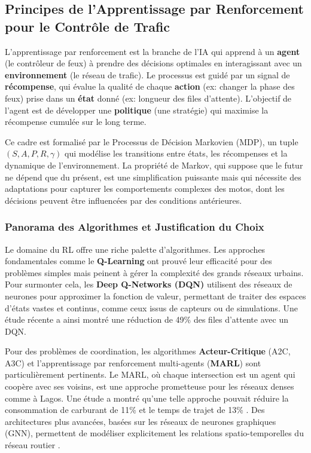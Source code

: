 \subsection{Principes de l'Apprentissage par Renforcement pour le Contrôle de Trafic}
\label{subsec:rl_principes_unifie}

L'apprentissage par renforcement est la branche de l'IA qui apprend à un \textbf{agent} (le contrôleur de feux) à prendre des décisions optimales en interagissant avec un \textbf{environnement} (le réseau de trafic). Le processus est guidé par un signal de \textbf{récompense}, qui évalue la qualité de chaque \textbf{action} (ex: changer la phase des feux) prise dans un \textbf{état} donné (ex: longueur des files d'attente). L'objectif de l'agent est de développer une \textbf{politique} (une stratégie) qui maximise la récompense cumulée sur le long terme.

Ce cadre est formalisé par le Processus de Décision Markovien (MDP), un tuple $(S, A, P, R, \gamma)$ qui modélise les transitions entre états, les récompenses et la dynamique de l'environnement. La propriété de Markov, qui suppose que le futur ne dépend que du présent, est une simplification puissante mais qui nécessite des adaptations pour capturer les comportements complexes des motos, dont les décisions peuvent être influencées par des conditions antérieures.

\subsubsection{Panorama des Algorithmes et Justification du Choix}
\label{subsubsec:rl_algos_unifie}

Le domaine du RL offre une riche palette d'algorithmes. Les approches fondamentales comme le \textbf{Q-Learning} ont prouvé leur efficacité pour des problèmes simples mais peinent à gérer la complexité des grands réseaux urbains. Pour surmonter cela, les \textbf{Deep Q-Networks (DQN)} utilisent des réseaux de neurones pour approximer la fonction de valeur, permettant de traiter des espaces d'états vastes et continus, comme ceux issus de capteurs ou de simulations. Une étude récente \cite{reinforcement2024approach} a ainsi montré une réduction de 49\% des files d'attente avec un DQN.

Pour des problèmes de coordination, les algorithmes \textbf{Acteur-Critique} (A2C, A3C) et l'apprentissage par renforcement multi-agents (\textbf{MARL}) sont particulièrement pertinents. Le MARL, où chaque intersection est un agent qui coopère avec ses voisins, est une approche prometteuse pour les réseaux denses comme à Lagos. Une étude a montré qu'une telle approche pouvait réduire la consommation de carburant de 11\% et le temps de trajet de 13\% \cite{multiagent2023reinforcement}. Des architectures plus avancées, basées sur les réseaux de neurones graphiques (GNN), permettent de modéliser explicitement les relations spatio-temporelles du réseau routier \cite{survey2025reinforcement}.

